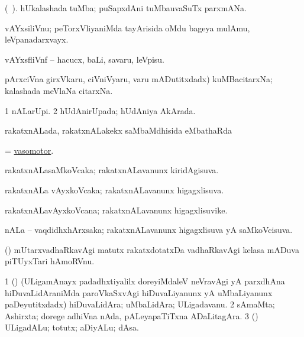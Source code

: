 \bentry
{} 
\gl{\nA}(\bava\ ). 
\bmng
 hUkalashada tuMba; puSapxdAni tuMbauvaSuTx parxmANa. 
\emng
\eentry

\bentry
{} 
\gl{\nA}
\expl{(\P) }
\bmng
 vAYxsiliVnu; peTorxVliyaniMda tayArisida oMdu bageya mulAmu, leVpanadarxvayx. 
\emng
\eentry

\bentry
{} 
\gl{\sakirx}
\expl{}
\bmng
 vAYxsfliVnf -- hacucx, baLi, savaru, leVpisu. 
\emng
\eentry

\bentry
{}
\gl{\nA}
\expl{}
\bmng
 \eng{(} pArxciVna girxVkaru, ciVniVyaru, \mo varu mADutitxdadx) kuMBacitarxNa; kalashada meVlaNa citarxNa. 
\emng
\eentry

\bentry
{} 
\gl{\gu}
\expl{}
\bmng
\bnum
\num{1} nALarUpi. 
\num{2} hUdAnirUpada; hUdAniya AkArada. 
\enum
\emng
\eentry

\bentry
{} 
\gl{\sapUpa}
\expl{}
\bmng
 rakatxnALada, rakatxnALakekx saMbaMdhisida eMbathaRda \sapUpa 
\emng
\eentry

\bentry
{} 
\gl{\gu}
\expl{}
\bmng
 = \hyperlink{vasomotor}{vasomotor}. 
\emng
\eentry

\bentry
{} 
\gl{\gu}
\expl{}
\bmng
 rakatxnALasaMkoVcaka; rakatxnALavanunx kiridAgisuva. 
\emng
\eentry

\bentry
{} 
\gl{\gu}
\expl{}
\bmng
 rakatxnALa vAyxkoVcaka; rakatxnALavanunx higagxlisuva. 
\emng
\eentry

\bentry
{} 
\gl{\nA}
\expl{}
\bmng
 rakatxnALavAyxkoVcana; rakatxnALavanunx higagxlisuvike. 
\emng
\eentry

\bentry
{} 
\gl{\gu}
\expl{}
\bmng
 nALa -- vaqdidhxhArxsaka; rakatxnALavanunx higagxlisuva yA saMkoVcisuva. 
\emng
\eentry

\bentry
{} 
\gl{\nA}
\expl{}
\bmng
 (\jiVra) mUtarxvadhaRkavAgi matutx rakatxdotatxDa vadhaRkavAgi kelasa mADuva piTUyxTari hAmoRVnu. 
\emng
\eentry

\bentry
{} 
\gl{\nA}
\expl{}
\bmng
\bnum
\num{1} (\ca) (ULigamAnayx padadhxtiyalilx doreyiMdaleV neVravAgi yA parxdhAna hiDuvaLidAraniMda paroVkaSxvAgi hiDuvaLiyanunx yA uMbaLiyanunx paDeyutitxdadx) hiDuvaLidAra; uMbaLidAra; ULigadavanu. 
\num{2} sAmaMta; Ashirxta; dorege adhiVna nAda, pALeyapaTiTxna ADaLitagAra. 
\num{3} (\rUpa) ULigadALu; totutx; aDiyALu; dAsa. 
\enum
\emng
\eentry

